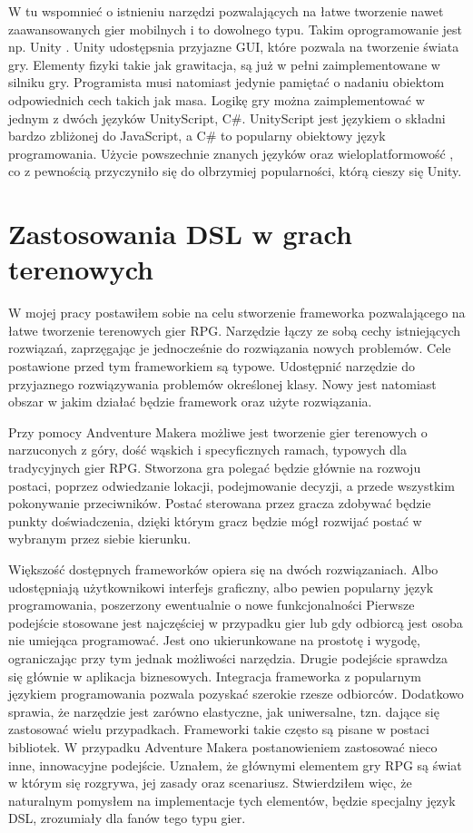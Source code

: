 \documentclass	{xmgr}
\begin{document}
W tu wspomnieć o istnieniu narzędzi pozwalających na łatwe tworzenie nawet zaawansowanych gier mobilnych i to dowolnego typu. Takim oprogramowanie jest np. Unity \cite{Unity3D:2017:Doc}. Unity udostępsnia przyjazne GUI, które pozwala na tworzenie świata gry. Elementy fizyki takie jak grawitacja, są już w pełni zaimplementowane w silniku gry. Programista musi natomiast jedynie pamiętać o nadaniu obiektom odpowiednich cech takich jak masa. Logikę gry można zaimplementować w jednym z dwóch języków UnityScript, C\#. UnityScript jest językiem o składni bardzo zbliżonej do JavaScript, a C\# to popularny obiektowy język programowania. Użycie powszechnie znanych języków oraz wieloplatformowość , co z pewnością przyczyniło się do olbrzymiej popularności, którą cieszy się Unity.

\section{Zastosowania DSL w grach terenowych}

W mojej pracy postawiłem sobie na celu stworzenie frameworka pozwalającego na łatwe tworzenie terenowych gier RPG. Narzędzie łączy ze sobą cechy istniejących rozwiązań, zaprzęgając je jednocześnie do rozwiązania nowych problemów. Cele postawione przed tym frameworkiem są typowe. Udostępnić narzędzie do przyjaznego rozwiązywania problemów określonej klasy. Nowy jest natomiast obszar w jakim działać będzie framework oraz użyte rozwiązania.

Przy pomocy Andventure Makera możliwe jest tworzenie gier terenowych o narzuconych z góry, dość wąskich i specyficznych ramach, typowych dla tradycyjnych gier RPG. Stworzona gra polegać będzie głównie na rozwoju postaci, poprzez odwiedzanie lokacji, podejmowanie decyzji, a przede wszystkim pokonywanie przeciwników. Postać sterowana przez gracza zdobywać będzie punkty doświadczenia, dzięki którym gracz będzie mógł rozwijać postać w wybranym przez siebie kierunku. 

Większość dostępnych frameworków opiera się na dwóch rozwiązaniach. Albo udostępniają użytkownikowi interfejs graficzny, albo pewien popularny język programowania, poszerzony ewentualnie o nowe funkcjonalności Pierwsze podejście stosowane jest najczęściej w przypadku gier lub gdy odbiorcą jest osoba nie umiejąca programować. Jest ono ukierunkowane na prostotę i wygodę, ograniczając przy tym jednak możliwości narzędzia. Drugie podejście sprawdza się głównie w aplikacja biznesowych. Integracja frameworka z popularnym językiem programowania pozwala pozyskać szerokie rzesze odbiorców. Dodatkowo sprawia, że narzędzie jest zarówno elastyczne, jak uniwersalne, tzn. dające się zastosować wielu przypadkach. Frameworki takie często są pisane w postaci bibliotek.
W przypadku Adventure Makera postanowieniem zastosować nieco inne, innowacyjne podejście. Uznałem, że głównymi elementem gry RPG są świat w którym się rozgrywa, jej zasady oraz scenariusz. Stwierdziłem więc, że naturalnym pomysłem na implementacje tych elementów, będzie specjalny język DSL, zrozumiały dla fanów tego typu gier.
\end{document}
